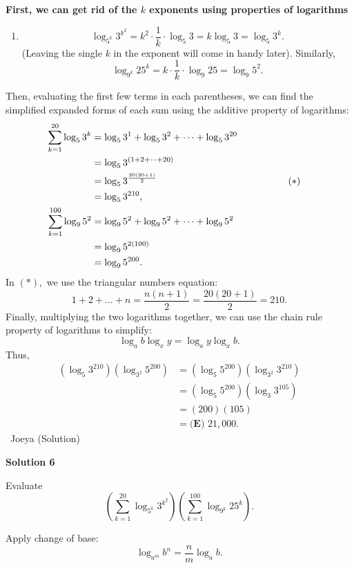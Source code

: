 \begin{enumerate}
\textbf{First, we can get rid of the $k$ exponents using properties of logarithms} 
            \begin{enumerate}[label=(\roman*)]
                \item 
 \[\log_{5^k} 3^{k^2} = k^2 \cdot \frac{1}{k} \cdot \log_{5} 3 = k\log_{5} 3 = \log_{5} 3^k.\] (Leaving the single $k$ in the exponent will come in handy later). Similarly, 
 \[\log_{9^k} 25^{k} = k \cdot \frac{1}{k} \cdot \log_{9} 25 = \log_{9} 5^2.\]
            \end{enumerate}
            Then, evaluating the first few terms in each parentheses, we can find the simplified expanded forms of each sum using the additive property of logarithms:
 \begin{align*} \sum_{k=1}^{20} \log_{5} 3^k &= \log_{5} 3^1 + \log_{5} 3^2 + \dots + \log_{5} 3^{20} \\ &= \log_{5} 3^{(1 + 2 + \dots + 20)} \\ &= \log_{5} 3^{\frac{20(20+1)}{2}} &&\hspace{15mm}(*) \\ &= \log_{5} 3^{210}, \\ \sum_{k=1}^{100} \log_{9} 5^2 &= \log_{9} 5^2 + \log_{9} 5^2 + \dots + \log_{9} 5^2 \\ &= \log_{9} 5^{2(100)} \\ &= \log_{9} 5^{200}. \end{align*}
In $(*),$ we use the triangular numbers equation: 
 \[1 + 2 + \dots + n = \frac{n(n+1)}{2} = \frac{20(20+1)}{2} = 210.\]Finally, multiplying the two logarithms together, we can use the chain rule property of logarithms to simplify:
 \[\log_{a} b\log_{x} y = \log_{a} y\log_{x} b.\]Thus,
 \begin{align*} \left(\log_{5} 3^{210}\right)\left(\log_{3^2} 5^{200}\right) &= \left(\log_{5} 5^{200}\right)\left(\log_{3^2} 3^{210}\right) \\ &= \left(\log_{5} 5^{200}\right)\left(\log_{3} 3^{105}\right) \\ &= (200)(105) \\ &= \boxed{\textbf{(E) }21{,}000}. \end{align*}
~Joeya (Solution)

 



\textbf{Solution 6}

Evaluate\[\left(\sum_{k=1}^{20}\log_{5^k}3^{k^2}\right)\left(\sum_{k=1}^{100}\log_{9^k}25^k\right).\]

 Apply change of base:
 \[\log_{a^m}b^n=\frac nm\log_a b.\]


\end{enumerate}
